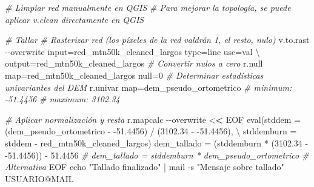 \documentclass[spanish]{article}
\newenvironment{Shaded}{\begin{snugshade}}{\end{snugshade}}
\newcommand{\AttributeTok}[1]{\textcolor[rgb]{0.77,0.63,0.00}{#1}}
\newcommand{\CommentTok}[1]{\textcolor[rgb]{0.56,0.35,0.01}{\textit{#1}}}
\newcommand{\DecValTok}[1]{\textcolor[rgb]{0.00,0.00,0.81}{#1}}
\newcommand{\ErrorTok}[1]{\textcolor[rgb]{0.64,0.00,0.00}{\textbf{#1}}}
\newcommand{\FloatTok}[1]{\textcolor[rgb]{0.00,0.00,0.81}{#1}}
\newcommand{\FunctionTok}[1]{\textcolor[rgb]{0.00,0.00,0.00}{#1}}
\newcommand{\NormalTok}[1]{#1}
\newcommand{\OtherTok}[1]{\textcolor[rgb]{0.56,0.35,0.01}{#1}}
\newcommand{\SpecialCharTok}[1]{\textcolor[rgb]{0.00,0.00,0.00}{#1}}
\newcommand{\StringTok}[1]{\textcolor[rgb]{0.31,0.60,0.02}{#1}}
\begin{document}
\begin{Shaded}
\begin{Highlighting}[]
\CommentTok{\# Limpiar red manualmente en QGIS}
\CommentTok{\# Para mejorar la topología, se puede aplicar v.clean directamente en QGIS}

\CommentTok{\# Tallar}
\CommentTok{\# Rasterizar red (los píxeles de la red valdrán 1, el resto, nulo)}
\NormalTok{v.to.rast }\SpecialCharTok{{-}{-}}\NormalTok{overwrite input}\OtherTok{=}\NormalTok{red\_mtn50k\_cleaned\_largos type}\OtherTok{=}\NormalTok{line use}\OtherTok{=}\NormalTok{val \textbackslash{}}
\NormalTok{  output}\OtherTok{=}\NormalTok{red\_mtn50k\_cleaned\_largos}
\CommentTok{\# Convertir nulos a cero}
\NormalTok{r.null map}\OtherTok{=}\NormalTok{red\_mtn50k\_cleaned\_largos null}\OtherTok{=}\DecValTok{0}
\CommentTok{\# Determinar estadísticas univariantes del DEM}
\NormalTok{r.univar map}\OtherTok{=}\NormalTok{dem\_pseudo\_ortometrico}
\CommentTok{\# minimum: {-}51.4456}
\CommentTok{\# maximum: 3102.34}

\CommentTok{\# Aplicar normalización y resta}
\NormalTok{r.mapcalc }\SpecialCharTok{{-}{-}}\NormalTok{overwrite }\SpecialCharTok{\textless{}}\ErrorTok{\textless{}}\NormalTok{ EOF}
\FunctionTok{eval}\NormalTok{(}\AttributeTok{stddem =}\NormalTok{ (dem\_pseudo\_ortometrico }\SpecialCharTok{{-}} \SpecialCharTok{{-}}\FloatTok{51.4456}\NormalTok{) }\SpecialCharTok{/}\NormalTok{ (}\FloatTok{3102.34} \SpecialCharTok{{-}} \SpecialCharTok{{-}}\FloatTok{51.4456}\NormalTok{), }\SpecialCharTok{\textbackslash{}}
     \AttributeTok{stddemburn =}\NormalTok{ stddem }\SpecialCharTok{{-}}\NormalTok{ red\_mtn50k\_cleaned\_largos)}
\NormalTok{dem\_tallado }\OtherTok{=}\NormalTok{ (stddemburn }\SpecialCharTok{*}\NormalTok{ (}\FloatTok{3102.34} \SpecialCharTok{{-}} \SpecialCharTok{{-}}\FloatTok{51.4456}\NormalTok{)) }\SpecialCharTok{{-}} \FloatTok{51.4456}
\CommentTok{\# dem\_tallado = stddemburn * dem\_pseudo\_ortometrico \# Alternativa}
\NormalTok{EOF}
\NormalTok{echo }\StringTok{"Tallado finalizado"} \SpecialCharTok{|}\NormalTok{ mail }\SpecialCharTok{{-}}\NormalTok{s }\StringTok{"Mensaje sobre tallado"}\NormalTok{ USUARIO}\SpecialCharTok{@}\NormalTok{MAIL}
\end{Highlighting}
\end{Shaded}
\end{document}

